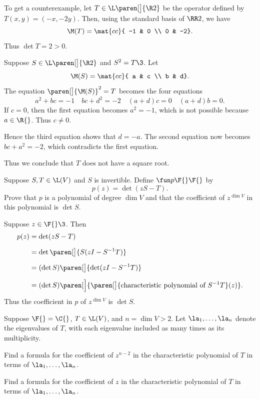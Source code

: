 \begin{Solution}
To get a counterexample, let $T \in \L\paren[\big]{\R2}$ be the operator defined by $T(x, y) = (-x, -2y)$. Then, using the standard basis of $\RR2$, we have
\[
\M(T) = \mat{cc}{
-1 & 0 \\
0 & -2}.
\]
Thus $\det T = 2 > 0$.

Suppose $S \in \L\paren[\big]{\R2}$ and $S^2 = T\3$. Let
\[
\M(S) = \mat{cc}{
a & c \\
b & d}.
\]
The equation $\paren[\big]{\M(S)}^2 = T$ becomes the four equations
\[
a^2 + bc = -1 \quad bc + d^2 = -2 \quad (a+d)c = 0 \quad (a+d) b = 0.
\]
If $c = 0$, then the first equation becomes $a^2 = -1$, which is not possible because $a \in \R{}$. Thus $c \ne 0$.

Hence the third equation shows that $d = -a$. The second equation now becomes $bc + a^2 = -2$, which contradicts the first equation.

Thus we conclude that $T$ does not have a square root.
\end{Solution}

\exercise
Suppose $S, T \in \L(V)$ and $S$ is invertible. Define $\fun p {\F{}} {\F{}}$ by
\[
p(z) = \det(zS - T).
\]
Prove that $p$ is a polynomial of degree $\dim V$ and that the coefficient of $z^{\dim V}$ in this polynomial is $\det S$.

\begin{Solution}
Suppose $z \in \F{}\3$. Then
\begin{align*}
p(z) &= \det(zS - T) \\[6bp]
&= \det \paren[\big]{ S(zI - S^{-1} T) }\\[6bp]
&= (\det S) \paren[\big]{ \det( zI - S^{-1}T) } \\[6bp]
&= (\det S)\paren[\Big]{ \paren[\big]{ \text{characteristic polynomial of } S^{-1} T }(z) }.
\end{align*}
Thus the coefficient in $p$ of $z^{\dim V}$ is $\det S$.
\end{Solution}

\exercise
Suppose $\F{} = \C{}$, $T \in \L(V)$, and $n = \dim V > 2$. Let $\la_1, \ldots, \la_n$ denote the eigenvalues of $T$, with each eigenvalue included as many times as its multiplicity.
\begin{subtheorem}
\item
Find a formula for the coefficient of $z^{n-2}$ in the characteristic polynomial of $T$ in terms of
$\la_1, \ldots, \la_n$.
\item
Find a formula for the coefficient of $z$ in the characteristic polynomial of $T$ in terms of
$\la_1, \ldots, \la_n$.
\end{subtheorem}
\exercisesubtheoremend

